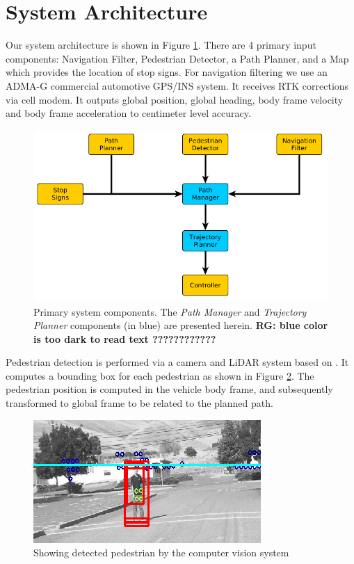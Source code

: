 \documentclass[letterpaper, 10 pt, conference]{ieeeconf}  %
\begin{document}

\section{System Architecture} \label{sec:systemarchirecture}

Our system architecture is shown in Figure \ref{fig:addreact}.
There are 4 primary input components: Navigation Filter, Pedestrian Detector, a Path Planner, and a Map which provides the location of stop signs.
For navigation filtering we use an ADMA-G  commercial automotive GPS/INS system.
It receives RTK corrections via cell modem.
It outputs global position, global heading, body frame velocity and body frame acceleration to centimeter level accuracy.

\begin{figure}[thpb]
  \centering
  \includegraphics[width=1.0\columnwidth]{graphics/MissingReactionPiece2.png}
  \caption{
   Primary system components. The {\it Path Manager} and {\it Trajectory Planner} components (in blue) are presented herein.
   \textbf{RG: blue color is too dark to read text ????????????}
  }
  \label{fig:addreact}
\end{figure}

Pedestrian detection is performed via a camera and LiDAR system based on \cite{Gepperth2013,Gepperth2014}.
It computes a bounding box for each pedestrian as shown in Figure \ref{fig:ped}.
The pedestrian position is computed in the vehicle body frame, and subsequently transformed to global frame to be related to the planned path.

\begin{figure}[thpb]
  \centering
  \includegraphics[width=0.5\columnwidth]{graphics/ped3.png}
  \caption{Showing detected pedestrian by the computer vision system
  \newline
  }
  \label{fig:ped}
\end{figure}
\end{document}
